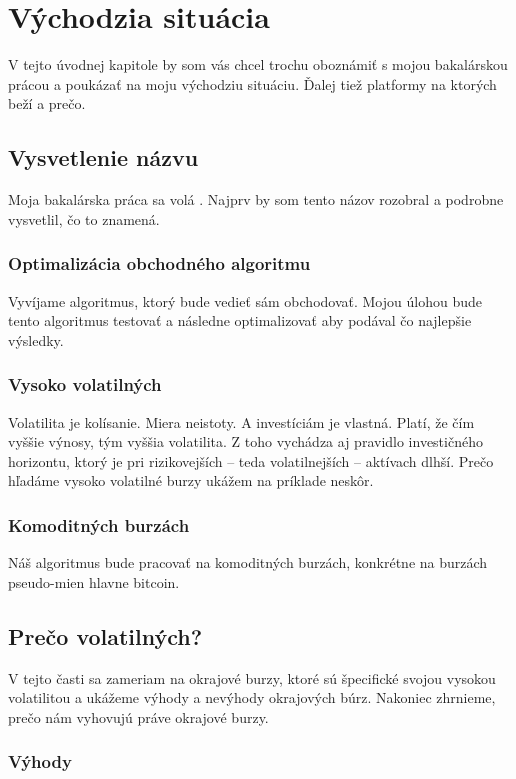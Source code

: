 \chapter{Východzia situácia}\label{chap:intro} 

V tejto úvodnej kapitole by som vás chcel trochu oboznámiť s mojou bakalárskou prácou a poukázať na moju východziu situáciu. Ďalej tiež platformy na ktorých beží a prečo. 
\section{Vysvetlenie názvu} 
Moja bakalárska práca sa volá . Najprv by som tento názov rozobral a podrobne vysvetlil, čo to znamená. 
\subsection{Optimalizácia obchodného algoritmu} 
Vyvíjame algoritmus, ktorý bude vedieť sám obchodovať. Mojou úlohou bude tento algoritmus testovať a následne optimalizovať aby podával čo najlepšie výsledky. 
\subsection{Vysoko volatilných} 
Volatilita\cite{Volatilita} je kolísanie. Miera neistoty. A investíciám je vlastná. Platí, že čím vyššie výnosy, tým vyššia volatilita. Z toho vychádza aj pravidlo investičného horizontu, ktorý je pri rizikovejších – teda volatilnejších – aktívach dlhší. Prečo hľadáme  vysoko volatilné burzy ukážem na príklade neskôr. 
\subsection{Komoditných burzách} 
Náš algoritmus bude pracovať na komoditných burzách, konkrétne na burzách pseudo-mien  hlavne bitcoin. 

\section{Prečo volatilných?} 
V tejto časti sa zameriam na okrajové burzy, ktoré sú špecifické svojou vysokou volatilitou 
a ukážeme výhody a nevýhody okrajových búrz. Nakoniec zhrnieme, prečo nám vyhovujú práve okrajové burzy. 
\subsection{Výhody} 
